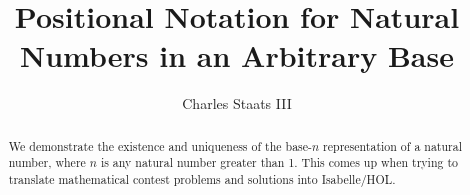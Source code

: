\documentclass[11pt,a4paper]{article}
\begin{document}
\title{Positional Notation for Natural Numbers in an Arbitrary Base}
\author{Charles Staats III}
\maketitle

\begin{abstract}
We demonstrate the existence and uniqueness of the base-$n$ representation of a natural number, where $n$ is any natural number greater than 1. This comes up when trying to translate mathematical contest problems and solutions into Isabelle/HOL.
\end{abstract}

\tableofcontents





\end{document}
